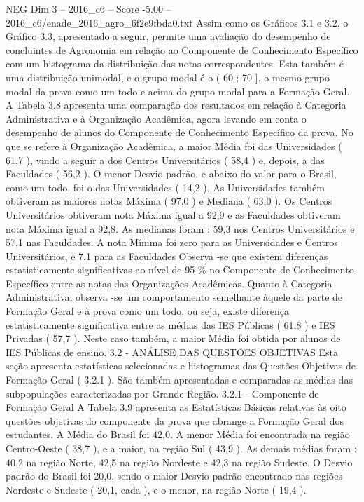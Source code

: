 \begin{textsample}{NEG Dim 3 – 2016\_c6 – Score -5.00 – 2016\_c6/enade\_2016\_agro\_6f2e9fbda0.txt}
Assim como os Gráficos 3.1 e 3.2, o Gráfico 3.3, apresentado a seguir, permite uma avaliação do desempenho de concluintes de Agronomia em relação ao Componente de Conhecimento Específico com um histograma da distribuição das notas correspondentes.
Esta também é uma distribuição unimodal, e o grupo modal é o ( 60 ; 70 ], o mesmo grupo modal da prova como um todo e acima do grupo modal para a Formação Geral.
A Tabela 3.8 apresenta uma comparação dos resultados em relação à Categoria Administrativa e à Organização Acadêmica, agora levando em conta o desempenho de alunos do Componente de Conhecimento Específico da prova.
No que se refere à Organização Acadêmica, a maior Média foi das Universidades ( 61,7 ), vindo a seguir a dos Centros Universitários ( 58,4 ) e, depois, a das Faculdades ( 56,2 ).
O menor Desvio padrão, e abaixo do valor para o Brasil, como um todo, foi o das Universidades ( 14,2 ).
As Universidades também obtiveram as maiores notas Máxima ( 97,0 ) e Mediana ( 63,0 ).
Os Centros Universitários obtiveram nota Máxima igual a 92,9 e as Faculdades obtiveram nota Máxima igual a 92,8.
As medianas foram : 59,3 nos Centros Universitários e 57,1 nas Faculdades.
A nota Mínima foi zero para as Universidades e Centros Universitários, e 7,1 para as Faculdades Observa -se que existem diferenças estatisticamente significativas ao nível de 95 \% no Componente de Conhecimento Específico entre as notas das Organizações Acadêmicas.
Quanto à Categoria Administrativa, observa -se um comportamento semelhante àquele da parte de Formação Geral e à prova como um todo, ou seja, existe diferença estatisticamente significativa entre as médias das IES Públicas ( 61,8 ) e IES Privadas ( 57,7 ).
Neste caso também, a maior Média foi obtida por alunos de IES Públicas de ensino. 3.2 - ANÁLISE DAS QUESTÕES OBJETIVAS Esta seção apresenta estatísticas selecionadas e histogramas das Questões Objetivas de Formação Geral ( 3.2.1 ).
São também apresentadas e comparadas as médias das subpopulações caracterizadas por Grande Região. 3.2.1 - Componente de Formação Geral A Tabela 3.9 apresenta as Estatísticas Básicas relativas às oito questões objetivas do componente da prova que abrange a Formação Geral dos estudantes.
A Média do Brasil foi 42,0.
A menor Média foi encontrada na região Centro-Oeste ( 38,7 ), e a maior, na região Sul ( 43,9 ).
As demais médias foram : 40,2 na região Norte, 42,5 na região Nordeste e 42,3 na região Sudeste.
O Desvio padrão do Brasil foi 20,0, sendo o maior Desvio padrão encontrado nas regiões Nordeste e Sudeste ( 20,1, cada ), e o menor, na região Norte ( 19,4 ).

\end{textsample}
